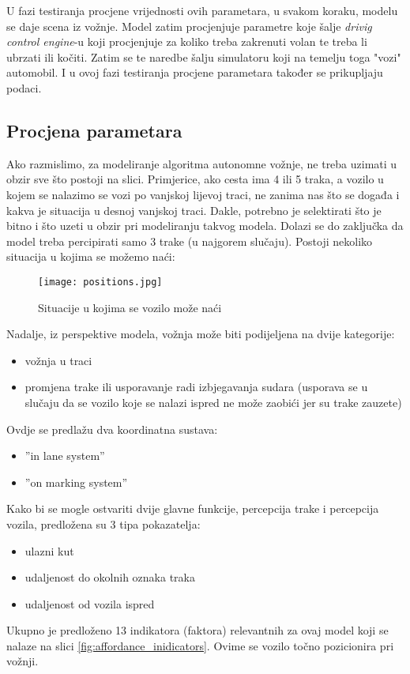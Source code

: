 \documentclass[seminar, utf8, numeric]{fer}
\begin{document}
U fazi testiranja procjene vrijednosti ovih parametara, u svakom koraku, modelu se daje scena iz vožnje. Model zatim procjenjuje parametre koje šalje \textit{drivig control engine}-u koji procjenjuje za koliko treba zakrenuti volan te treba li ubrzati ili kočiti. Zatim se te naredbe šalju simulatoru koji na temelju toga "vozi" automobil. I u ovoj fazi testiranja procjene parametara također se prikupljaju podaci.\\

\subsection{Procjena parametara}
Ako razmislimo, za modeliranje algoritma autonomne vožnje, ne treba uzimati u obzir sve što postoji na slici. Primjerice, ako cesta ima 4 ili 5 traka, a vozilo u kojem se nalazimo se vozi po vanjskoj lijevoj traci, ne zanima nas što se događa i kakva je situacija u desnoj vanjskoj traci. Dakle, potrebno je selektirati što je bitno i što uzeti u obzir pri modeliranju takvog modela. Dolazi se do zaključka da model treba percipirati samo 3 trake (u najgorem slučaju). Postoji nekoliko situacija u kojima se možemo naći:

\begin{figure}[htp]
\centering
\texttt{[image: positions.jpg]}
\caption{Situacije u kojima se vozilo može naći \cite{deepDrive}}
\label{fig:car_positions}
\end{figure}

Nadalje, iz perspektive modela, vožnja može biti podijeljena na dvije kategorije:
\renewcommand{\labelitemi}{\textbullet}
\begin{itemize}
	\item vožnja u traci
	\item promjena trake ili usporavanje radi izbjegavanja sudara (usporava se u slučaju da se vozilo koje se nalazi ispred ne može zaobići jer su trake zauzete)
\end{itemize}
Ovdje se predlažu dva koordinatna sustava:
\renewcommand{\labelitemi}{\textbullet}
\begin{itemize}
	\item ''in lane system''
	\item ''on marking system''
\end{itemize}
Kako bi se mogle ostvariti dvije glavne funkcije, percepcija trake i percepcija vozila, predložena su 3 tipa pokazatelja:
\renewcommand{\labelitemi}{\textbullet}
\begin{itemize}
	\item ulazni kut
	\item udaljenost do okolnih oznaka traka
	\item udaljenost od vozila ispred
\end{itemize}
Ukupno je predloženo 13 indikatora (faktora) relevantnih za ovaj model koji se nalaze na slici \ref{fig:affordance_inidicators}. Ovime se vozilo točno pozicionira pri vožnji.
\end{document}
